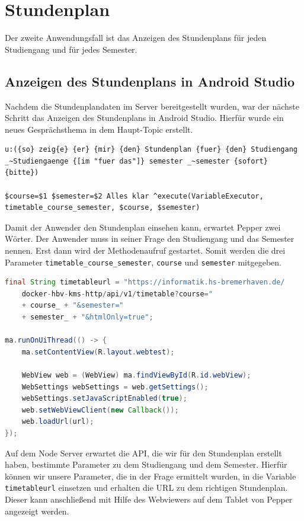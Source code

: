 \section{Stundenplan}

Der zweite Anwendungsfall ist das Anzeigen des Stundenplans für jeden Studiengang und für jedes Semester. \\


\subsection{Anzeigen des Stundenplans in Android Studio}
Nachdem die Stundenplandaten im Server bereitgestellt wurden, war der nächste Schritt das Anzeigen des Stundenplans in Android Studio. 
Hierfür wurde ein neues Gesprächsthema in dem Haupt-Topic erstellt.\\

\begin{lstlisting}
u:({so} zeig{e} {er} {mir} {den} Stundenplan {fuer} {den} Studiengang 
_~Studiengaenge {[im "fuer das"]} semester _~semester {sofort} {bitte})

$course=$1 $semester=$2 Alles klar ^execute(VariableExecutor, 
timetable_course_semester, $course, $semester)
\end{lstlisting}

Damit der Anwender den Stundenplan einsehen kann, erwartet Pepper zwei Wörter. Der Anwender muss in seiner Frage den Studiengang und das Semester 
nennen. Erst dann wird der Methodenaufruf gestartet. Somit werden die drei Parameter \verb|timetable_course_semester|, 
\verb|course| und \verb|semester| mitgegeben.\\

\begin{lstlisting}[language=Java]
final String timetableurl = "https://informatik.hs-bremerhaven.de/
    docker-hbv-kms-http/api/v1/timetable?course="
    + course_ + "&semester="
    + semester_ + "&htmlOnly=true";

ma.runOnUiThread(() -> {
	ma.setContentView(R.layout.webtest);

	WebView web = (WebView) ma.findViewById(R.id.webView);
	WebSettings webSettings = web.getSettings();
	webSettings.setJavaScriptEnabled(true);
	web.setWebViewClient(new Callback());
	web.loadUrl(url);
});
\end{lstlisting}

Auf dem Node Server erwartet die API, die wir für den Stundenplan erstellt haben, bestimmte Parameter zu dem Studiengang und dem Semester. Hierfür können wir unsere Parameter, die in der Frage ermittelt wurden, in die Variable \verb|timetableurl| einsetzen und erhalten 
die URL zu dem richtigen Stundenplan. Dieser kann anschließend mit Hilfe des Webviewers auf dem Tablet von Pepper angezeigt werden. 

